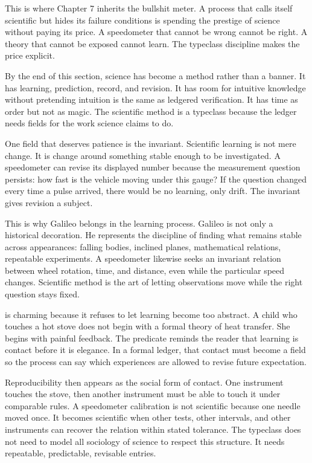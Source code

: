 This is where Chapter 7 inherits the bullshit meter. A process that calls
itself scientific but hides its failure conditions is spending the prestige of
science without paying its price. A speedometer that cannot be wrong cannot be
right. A theory that cannot be exposed cannot learn. The typeclass discipline
makes the price explicit.

By the end of this section, science has become a method rather than a banner.
It has learning, prediction, record, and revision. It has room for intuitive
knowledge without pretending intuition is the same as ledgered verification. It
has time as order but not as magic. The scientific method is a typeclass because
the ledger needs fields for the work science claims to do.

One field that deserves patience is the invariant. Scientific learning is not
mere change. It is change around something stable enough to be investigated. A
speedometer can revise its displayed number because the measurement question
persists: how fast is the vehicle moving under this gauge? If the question
changed every time a pulse arrived, there would be no learning, only drift. The
invariant gives revision a subject.

This is why Galileo belongs in the learning process. Galileo is not only a
historical decoration. He represents the discipline of finding what remains
stable across appearances: falling bodies, inclined planes, mathematical
relations, repeatable experiments. A speedometer likewise seeks an invariant
relation between wheel rotation, time, and distance, even while the particular
speed changes. Scientific method is the art of letting observations move while
the right question stays fixed.

 is charming because it refuses to let learning become too
abstract. A child who touches a hot stove does not begin with a formal theory
of heat transfer. She begins with painful feedback. The predicate reminds the
reader that learning is contact before it is elegance. In a formal ledger, that
contact must become a field so the process can say which experiences are
allowed to revise future expectation.

Reproducibility then appears as the social form of contact. One instrument
touches the stove, then another instrument must be able to touch it under
comparable rules. A speedometer calibration is not scientific because one
needle moved once. It becomes scientific when other tests, other intervals, and
other instruments can recover the relation within stated tolerance. The
typeclass does not need to model all sociology of science to respect this
structure. It needs repeatable, predictable, revisable entries.

